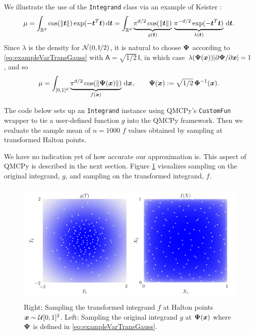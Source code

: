 \documentclass[graybox,footinfo]{svmult}
\newcommand{\QMCPYabs}[1]{\ensuremath{{\left \lvert #1 \right \rvert}}}
\newcommand{\mA}{\mathsf{A}}
\newcommand{\mI}{\mathsf{I}}
\begin{document}
We illustrate the use of the \texttt{Integrand} class via an example of Keister \cite{Kei96}:
\begin{equation} \label{eq:KeisterIntegral}
	\mu 
	= \int_{\bbR^d} \cos(\lVert \bst \rVert) \exp(-\bst^T \bst) \, \D \bst \\ 
	= \int_{\bbR^d} \underbrace{\pi^{d/2} \cos(\lVert \bst \rVert)}_{g(\bst)}\, \underbrace{\pi^{-d/2} \exp(-\bst^T \bst) }_{\lambda(\bst)} \, \D \bst.
\end{equation}
Since $\lambda$ is the density for $\calN(0,\mI/2)$, it is natural to choose ${\boldsymbol{\Psi}}$ according to \eqref{eq:exampleVarTransGauss} with $\mA = \sqrt{1/2} \, \mI$, in which case $\lambda(\bsPsi(\bsx)) \QMCPYabs{\partial \bsPsi/\partial \bsx} = 1$, and so 
\[
\mu = \int_{[0,1]^d} \underbrace{\pi^{d/2} \cos(\lVert {\boldsymbol{\Psi}}({\boldsymbol{x}}) \rVert)}_{f({\boldsymbol{x}})} \, \mathrm{d} {\boldsymbol{x}}, \qquad 
{\boldsymbol{\Psi}}({\boldsymbol{x}}) := \sqrt{1/2} \,{\boldsymbol{\Phi}}^{-1}({\boldsymbol{x}}).
\]

The code below sets up an \texttt{Integrand} instance using QMCPy's \texttt{CustomFun} wrapper to tie a user-defined function $g$ into the QMCPy framework.  Then we evaluate the sample mean of $n=1000$ $f$ values obtained by sampling at transformed Halton points.

We have no indication yet of how accurate our approximation is.  This aspect of QMCPy is described in the next section.  Figure \ref{fig:ikc} visualizes sampling on the original integrand, $g$, and sampling on the transformed integrand, $f$. 

\begin{figure}
	\includegraphics[height=6cm]{QMCSoftwareArticle/figs/i_keister_contours.png}
	\caption{Right: Sampling the transformed integrand $f$ at Halton points ${\boldsymbol{x}} \sim {\mathcal{U}}[0,1]^2$. Left: Sampling the original integrand $g$ at ${\boldsymbol{\Psi}}({\boldsymbol{x}})$ where ${\boldsymbol{\Psi}}$ is defined in \eqref{eq:exampleVarTransGauss}.  } \label{fig:ikc}
\end{figure}
\end{document}
